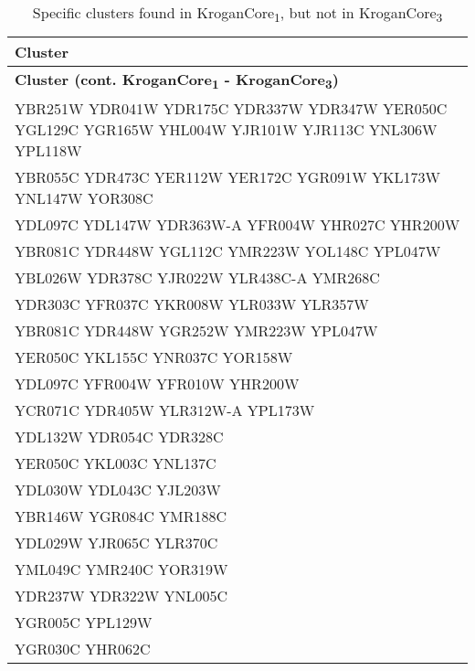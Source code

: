 \setlength{\extrarowheight}{2pt}
\renewcommand{\arraystretch}{1.2}
\begin{longtable}{| m{27em} |}
\caption{Specific clusters found in KroganCore\textsubscript{1}, but not in KroganCore\textsubscript{3}} \\
\hline
\textbf{Cluster} \\
\hline
\endfirsthead
\hline
\textbf{Cluster (cont. KroganCore\textsubscript{1} - KroganCore\textsubscript{3})} \\
\hline
\endhead
\hline
\endfoot
\hline
\endlastfoot
YBR251W YDR041W YDR175C YDR337W YDR347W YER050C YGL129C YGR165W YHL004W YJR101W YJR113C YNL306W YPL118W \\
\hline
YBR055C YDR473C YER112W YER172C YGR091W YKL173W YNL147W YOR308C \\
\hline
YDL097C YDL147W YDR363W-A YFR004W YHR027C YHR200W \\
\hline
YBR081C YDR448W YGL112C YMR223W YOL148C YPL047W \\
\hline
YBL026W YDR378C YJR022W YLR438C-A YMR268C \\
\hline
YDR303C YFR037C YKR008W YLR033W YLR357W \\
\hline
YBR081C YDR448W YGR252W YMR223W YPL047W \\
\hline
YER050C YKL155C YNR037C YOR158W \\
\hline
YDL097C YFR004W YFR010W YHR200W \\
\hline
YCR071C YDR405W YLR312W-A YPL173W \\
\hline
YDL132W YDR054C YDR328C \\
\hline
YER050C YKL003C YNL137C \\
\hline
YDL030W YDL043C YJL203W \\
\hline
YBR146W YGR084C YMR188C \\
\hline
YDL029W YJR065C YLR370C \\
\hline
YML049C YMR240C YOR319W \\
\hline
YDR237W YDR322W YNL005C \\
\hline
YGR005C YPL129W \\
\hline
YGR030C YHR062C \\
\hline
\end{longtable}